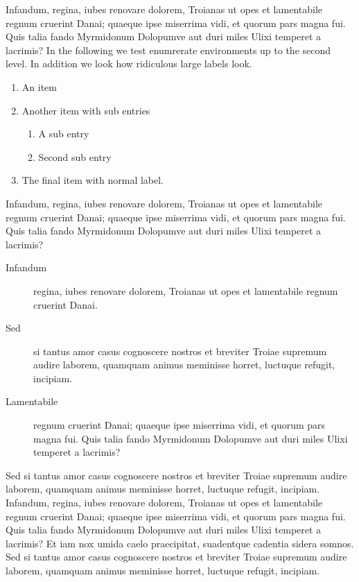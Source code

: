 \documentclass[
   \selectedoptions
  ]
  {aipproc}
\begin{document}
Infandum, regina, iubes renovare dolorem, Troianas ut opes et
lamentabile regnum cruerint Danai; quaeque ipse miserrima vidi, et
quorum pars magna fui. Quis talia fando Myrmidonum Dolopumve aut duri
miles Ulixi temperet a \cite{EVH:Office} lacrimis? In the following we test enumrerate
environments up to the second level. In addition we look how
ridiculous large labels look.
\begin{enumerate}
\item
  An item \cite{Liang:1983}
\item 
  Another item with sub entries
  \begin{enumerate}
  \item
   A sub entry \cite{Wang}
  \item
   Second sub entry
  \end{enumerate}
\item
  The final item with normal label.
\end{enumerate}
Infandum, regina, iubes renovare dolorem, Troianas ut opes et
lamentabile regnum cruerint Danai; quaeque ipse miserrima vidi, et
quorum pars magna fui. Quis talia  fando Myrmidonum Dolopumve aut duri
miles Ulixi temperet a lacrimis? 
\begin{description}
\item[Infandum] 
 regina, iubes renovare dolorem, Troianas ut opes et lamentabile
 regnum cruerint Danai.
\item[Sed]
 si tantus amor casus cognoscere nostros et breviter Troiae supremum
 audire laborem, quamquam animus meminisse horret, luctuque refugit,
 incipiam.
\item[Lamentabile] regnum cruerint Danai; quaeque ipse miserrima vidi, et
quorum pars magna fui. Quis talia  fando Myrmidonum Dolopumve aut duri
miles Ulixi temperet a lacrimis? 
\end{description}


Sed si tantus amor casus
cognoscere nostros et breviter Troiae supremum audire laborem,
quamquam animus meminisse horret, luctuque refugit, incipiam.
Infandum, regina, iubes renovare dolorem, Troianas ut opes et
lamentabile regnum cruerint Danai; quaeque ipse miserrima vidi, et
quorum pars magna fui. Quis talia fando Myrmidonum Dolopumve aut duri
miles Ulixi temperet a lacrimis? Et iam nox umida caelo praecipitat,
suadentque cadentia sidera somnos. Sed si tantus amor casus
cognoscere nostros et breviter Troiae supremum audire laborem,
quamquam animus meminisse horret, luctuque refugit, incipiam.
\end{document}
